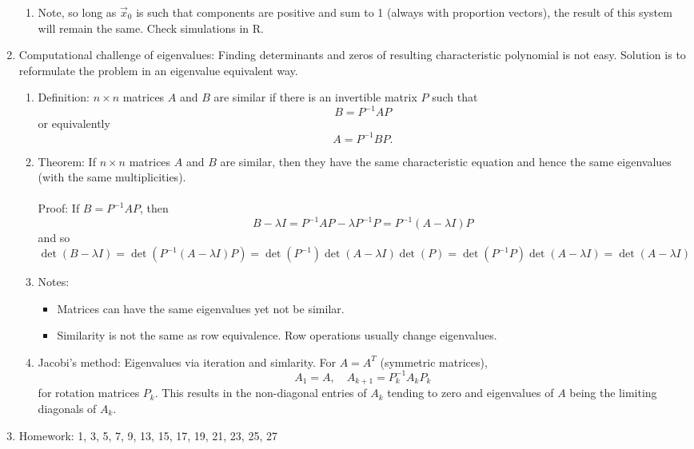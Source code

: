 \documentclass{article}
\begin{document}
\begin{enumerate}
\begin{enumerate}
\item Note, so long as $\vec{x}_0$ is such that components are positive and sum to 1 (always with proportion vectors), the result of this system will remain the same. Check simulations in R.

\end{enumerate}


\item Computational challenge of eigenvalues: Finding determinants and zeros of resulting characteristic polynomial is not easy. Solution is to reformulate the problem in an eigenvalue equivalent way.
\begin{enumerate}

\item Definition: $n \times n$ matrices $A$ and $B$ are similar if there is an invertible matrix $P$ such that 
\[
B = P^{-1}A P
\]
or equivalently
\[
A = P^{-1}B P.
\]

\item Theorem: If $n \times n$ matrices $A$ and $B$ are similar, then they have the same characteristic equation and hence the same eigenvalues (with the same multiplicities). \\ \ \\
Proof: If $B = P^{-1}AP$, then
\[
B - \lambda I = P^{-1}AP - \lambda P^{-1}P = P^{-1} (A-\lambda I) P
\]
and so
\[
\det(B - \lambda I) = \det( P^{-1} (A-\lambda I) P)
= \det( P^{-1}) \det(A-\lambda I) \det(P)
= \det( P^{-1}P) \det(A-\lambda I) 
=\det(A-\lambda I) 
\]

\item Notes:
\begin{itemize}
\item Matrices can have the same eigenvalues yet not be similar.
\item Similarity is not the same as row equivalence. Row operations usually change eigenvalues.
\end{itemize}

\item Jacobi's method: Eigenvalues via iteration and simlarity. For $A=A^T$ (symmetric matrices),
\[
A_1 = A, \quad A_{k+1} = P_k^{-1} A_k P_k
\] 
for rotation matrices $P_k$. This results in the non-diagonal entries of $A_k$ tending to zero and eigenvalues of $A$ being the limiting diagonals of $A_k$. 

\end{enumerate}

\item Homework: 1, 3, 5, 7, 9, 13, 15, 17, 19, 21, 23, 25, 27

\end{enumerate}
\end{document}
